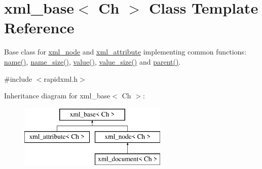 \hypertarget{classrapidxml_1_1xml__base}{}\section{xml\+\_\+base$<$ Ch $>$ Class Template Reference}
\label{classrapidxml_1_1xml__base}


Base class for \mbox{\hyperlink{classrapidxml_1_1xml__node}{xml\+\_\+node}} and \mbox{\hyperlink{classrapidxml_1_1xml__attribute}{xml\+\_\+attribute}} implementing common functions\+: \mbox{\hyperlink{classrapidxml_1_1xml__base_af8436e9ee14c127220113eaa956eafee}{name()}}, \mbox{\hyperlink{classrapidxml_1_1xml__base_ad01e2eff02202b130baad012d1ed7328}{name\+\_\+size()}}, \mbox{\hyperlink{classrapidxml_1_1xml__base_a558b1045e6751e4024309d41bf35c542}{value()}}, \mbox{\hyperlink{classrapidxml_1_1xml__base_aa6981b3244607ea4ae7634f74f25361b}{value\+\_\+size()}} and \mbox{\hyperlink{classrapidxml_1_1xml__base_a7f177e162f72f65ea1f0f0188e41c1ba}{parent()}}.  




{\ttfamily \#include $<$rapidxml.\+h$>$}

Inheritance diagram for xml\+\_\+base$<$ Ch $>$\+:\begin{figure}[H]
\begin{center}
\leavevmode
\includegraphics[height=3.000000cm]{classrapidxml_1_1xml__base}
\end{center}
\end{figure}
